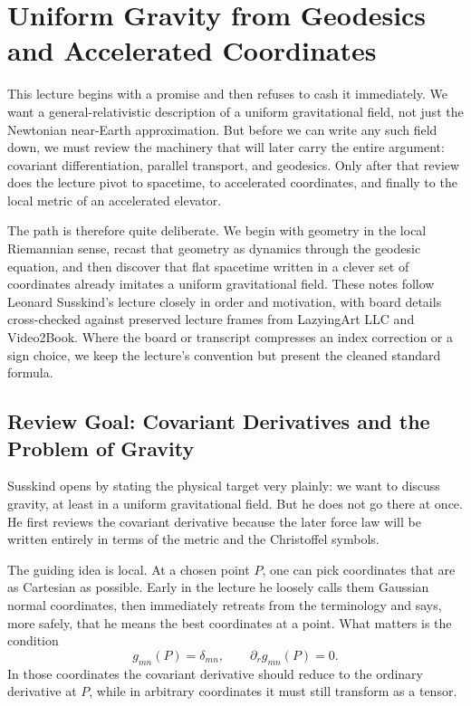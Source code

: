 \chapter{Uniform Gravity from Geodesics and Accelerated Coordinates}

This lecture begins with a promise and then refuses to cash it immediately. We want a general-relativistic description of a uniform gravitational field, not just the Newtonian near-Earth approximation. But before we can write any such field down, we must review the machinery that will later carry the entire argument: covariant differentiation, parallel transport, and geodesics. Only after that review does the lecture pivot to spacetime, to accelerated coordinates, and finally to the local metric of an accelerated elevator.

The path is therefore quite deliberate. We begin with geometry in the local Riemannian sense, recast that geometry as dynamics through the geodesic equation, and then discover that flat spacetime written in a clever set of coordinates already imitates a uniform gravitational field. These notes follow Leonard Susskind's lecture closely in order and motivation, with board details cross-checked against preserved lecture frames from LazyingArt LLC and Video2Book. Where the board or transcript compresses an index correction or a sign choice, we keep the lecture's convention but present the cleaned standard formula.

\section{Review Goal: Covariant Derivatives and the Problem of Gravity}

Susskind opens by stating the physical target very plainly: we want to discuss gravity, at least in a uniform gravitational field. But he does not go there at once. He first reviews the covariant derivative because the later force law will be written entirely in terms of the metric and the Christoffel symbols.

The guiding idea is local. At a chosen point \(P\), one can pick coordinates that are as Cartesian as possible. Early in the lecture he loosely calls them Gaussian normal coordinates, then immediately retreats from the terminology and says, more safely, that he means the best coordinates at a point. What matters is the condition
\begin{equation}
g_{mn}(P)=\delta_{mn},
\qquad
\partial_r g_{mn}(P)=0.
\end{equation}
In those coordinates the covariant derivative should reduce to the ordinary derivative at \(P\), while in arbitrary coordinates it must still transform as a tensor.

